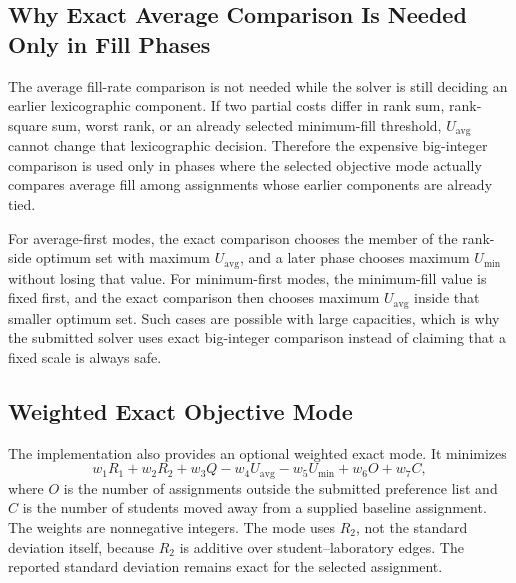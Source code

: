 \documentclass[11pt,a4paper]{article}
\begin{document}
\subsection{Why Exact Average Comparison Is Needed Only in Fill Phases}

The average fill-rate comparison is not needed while the solver is still
deciding an earlier lexicographic component.  If two partial costs differ in
rank sum, rank-square sum, worst rank, or an already selected minimum-fill
threshold, \(U_{\mathrm{avg}}\) cannot change that lexicographic decision.
Therefore the expensive big-integer comparison is used only in phases where
the selected objective mode actually compares average fill among assignments
whose earlier components are already tied.

For average-first modes, the exact comparison chooses the member of the
rank-side optimum set with maximum \(U_{\mathrm{avg}}\), and a later phase
chooses maximum \(U_{\min}\) without losing that value.  For minimum-first
modes, the minimum-fill value is fixed first, and the exact comparison then
chooses maximum \(U_{\mathrm{avg}}\) inside that smaller optimum set.  Such
cases are possible with large capacities, which is why the submitted solver
uses exact big-integer comparison instead of claiming that a fixed scale is
always safe.

\subsection{Weighted Exact Objective Mode}

The implementation also provides an optional weighted exact mode.  It
minimizes
\[
  w_1R_1+w_2R_2+w_3Q-w_4U_{\mathrm{avg}}-w_5U_{\min}+w_6O+w_7C,
\]
where \(O\) is the number of assignments outside the submitted preference
list and \(C\) is the number of students moved away from a supplied baseline
assignment.  The weights are nonnegative integers.  The mode uses \(R_2\), not
the standard deviation itself, because \(R_2\) is additive over
student--laboratory edges.  The reported standard deviation remains exact for
the selected assignment.
\end{document}
